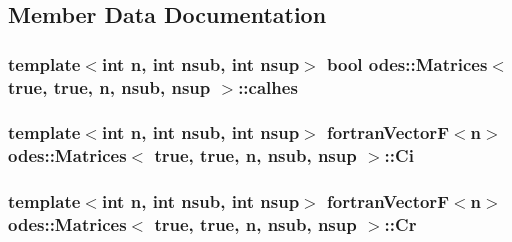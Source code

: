 \subsection{Member Data Documentation}
\hypertarget{classodes_1_1Matrices_3_01true_00_01true_00_01n_00_01nsub_00_01nsup_01_4_aea9e813e18fdb891846220218848e30f}{
\subsubsection[{calhes}]{\setlength{\rightskip}{0pt plus 5cm}template$<$int n, int nsub, int nsup$>$ bool {\bf odes\-::\-Matrices}$<$ true, true, n, nsub, nsup $>$\-::calhes\hspace{0.3cm}{\ttfamily [protected]}}}\label{classodes_1_1Matrices_3_01true_00_01true_00_01n_00_01nsub_00_01nsup_01_4_aea9e813e18fdb891846220218848e30f}
\hypertarget{classodes_1_1Matrices_3_01true_00_01true_00_01n_00_01nsub_00_01nsup_01_4_aa8634c8ad1096a2027f60cd7c90c480f}{
\subsubsection[{Ci}]{\setlength{\rightskip}{0pt plus 5cm}template$<$int n, int nsub, int nsup$>$ {\bf fortran\-Vector\-F}$<$n$>$ {\bf odes\-::\-Matrices}$<$ true, true, n, nsub, nsup $>$\-::Ci\hspace{0.3cm}{\ttfamily [private]}}}\label{classodes_1_1Matrices_3_01true_00_01true_00_01n_00_01nsub_00_01nsup_01_4_aa8634c8ad1096a2027f60cd7c90c480f}
\hypertarget{classodes_1_1Matrices_3_01true_00_01true_00_01n_00_01nsub_00_01nsup_01_4_a9b0fa0b5ed5e60ea4d2a34c3bcccfdb4}{
\subsubsection[{Cr}]{\setlength{\rightskip}{0pt plus 5cm}template$<$int n, int nsub, int nsup$>$ {\bf fortran\-Vector\-F}$<$n$>$ {\bf odes\-::\-Matrices}$<$ true, true, n, nsub, nsup $>$\-::Cr\hspace{0.3cm}{\ttfamily [private]}}}\label{classodes_1_1Matrices_3_01true_00_01true_00_01n_00_01nsub_00_01nsup_01_4_a9b0fa0b5ed5e60ea4d2a34c3bcccfdb4}
